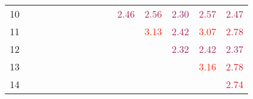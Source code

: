 \documentclass[a3paper,extrafontsizes,20pt, ngerman]{memoir}
\begin{document}
\begin{figure}
\begin{tabular}{c|cccccccccccccc}
        10                   &                                  &                                  &                                  &                                  &                                  &                                  &                                  &                                  &                                  & \textcolor[HTML]{ ab2053 }{2.46} & \textcolor[HTML]{ b72047 }{2.56} & \textcolor[HTML]{ 992065 }{2.30} & \textcolor[HTML]{ b92045 }{2.57} & \textcolor[HTML]{ ad2051 }{2.47} \\
        11                   &                                  &                                  &                                  &                                  &                                  &                                  &                                  &                                  &                                  &                                  & \textcolor[HTML]{ fc2002 }{3.13} & \textcolor[HTML]{ a72057 }{2.42} & \textcolor[HTML]{ f4200a }{3.07} & \textcolor[HTML]{ d2202c }{2.78} \\
        12                   &                                  &                                  &                                  &                                  &                                  &                                  &                                  &                                  &                                  &                                  &                                  & \textcolor[HTML]{ 9b2063 }{2.32} & \textcolor[HTML]{ a82056 }{2.42} & \textcolor[HTML]{ a1205d }{2.37} \\
        13                   &                                  &                                  &                                  &                                  &                                  &                                  &                                  &                                  &                                  &                                  &                                  &                                  & \textcolor[HTML]{ ff2000 }{3.16} & \textcolor[HTML]{ d2202c }{2.78} \\
        14                   &                                  &                                  &                                  &                                  &                                  &                                  &                                  &                                  &                                  &                                  &                                  &                                  &                                  & \textcolor[HTML]{ cd2031 }{2.74} \\
    \end{tabular}


\end{figure}
\end{document}
